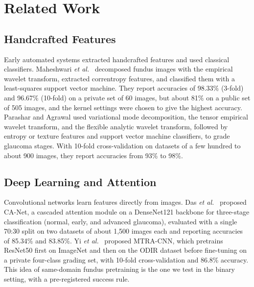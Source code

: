 \section{Related Work}
\label{sec:related}
\subsection{Handcrafted Features}
Early automated systems extracted handcrafted features and used classical classifiers. Maheshwari \emph{et al.}\ \cite{maheshwari2017} decomposed fundus images with the empirical wavelet transform, extracted correntropy features, and classified them with a least-squares support vector machine. They report accuracies of 98.33\% (3-fold) and 96.67\% (10-fold) on a private set of 60 images, but about 81\% on a public set of 505 images, and the kernel settings were chosen to give the highest accuracy. Parashar and Agrawal \cite{parashar2021a,parashar2021b,parashar2020} used variational mode decomposition, the tensor empirical wavelet transform, and the flexible analytic wavelet transform, followed by entropy or texture features and support vector machine classifiers, to grade glaucoma stages. With 10-fold cross-validation on datasets of a few hundred to about 900 images, they report accuracies from 93\% to 98\%.

\subsection{Deep Learning and Attention}
Convolutional networks learn features directly from images. Das \emph{et al.}\ \cite{das2023} proposed CA-Net, a cascaded attention module on a DenseNet121 backbone for three-stage classification (normal, early, and advanced glaucoma), evaluated with a single 70:30 split on two datasets of about 1,500 images each and reporting accuracies of 85.34\% and 83.85\%. Yi \emph{et al.}\ \cite{yi2023} proposed MTRA-CNN, which pretrains ResNet50 first on ImageNet and then on the ODIR dataset before fine-tuning on a private four-class grading set, with 10-fold cross-validation and 86.8\% accuracy. This idea of same-domain fundus pretraining is the one we test in the binary setting, with a pre-registered success rule.

